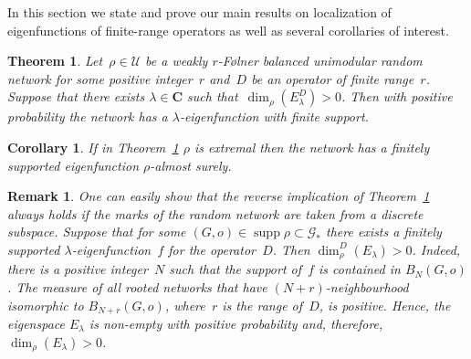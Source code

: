 \documentclass[10pt,a4paper]{amsart}
\newtheorem{corollary}[lemma]{Corollary}
\newtheorem{theorem}[lemma]{Theorem}
\newtheorem{remark}[lemma]{Remark}
\DeclareMathOperator{\supp}{supp}%
\newcommand*{\field}[1]{\mathbf{#1}} %
\newcommand*\C{\field{C}} %
\begin{document}
In this section we state and prove our main results on localization of eigenfunctions of finite-range operators as well as several corollaries of interest. 

\begin{theorem}\label{theorem:main}
    Let~$\rho \in \mathcal{U}$ be a weakly $r$-{F\o lner} balanced unimodular random network for some positive integer~$r$ and~$D$ be an operator of finite range~$r$. Suppose that there exists $\lambda\in \C$ such that~$\dim_\rho(E_\lambda^D) > 0$. Then with positive probability the network has a $\lambda$-eigenfunction with finite support.
\end{theorem}

\begin{corollary}
    If in Theorem~\ref{theorem:main} $\rho$ is extremal then the network has a finitely supported eigenfunction $\rho$-almost surely.
\end{corollary}

\begin{remark}
    One can easily show that the reverse implication of Theorem~\ref{theorem:main} always holds if the marks of the random network are taken from a discrete subspace. Suppose that for some $(G,o) \in \supp \rho \subset \mathcal{G}_*$  there exists a finitely supported $\lambda$-eigenfunction~$f$ for the operator~$D$. Then $\dim_\rho^D(E_\lambda) > 0$. Indeed, there is a positive integer~$N$ such that the support of~$f$ is contained in $B_N(G,o)$. The measure of all rooted networks that have $(N+r)$-neighbourhood isomorphic to $B_{N+r}(G,o)$, where~$r$ is the range of~$D$, is positive. Hence, the eigenspace $E_\lambda$ is non-empty with positive probability and, therefore, $\dim_\rho(E_\lambda) > 0$.   
\end{remark}
\end{document}
